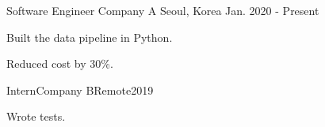 \documentclass[11pt, a4paper]{awesome-cv}
\begin{document}
\makecvheader
{}
\begin{cventries}
  \cventry
    {Software Engineer}
    {Company A}
    {Seoul, Korea}
    {Jan. 2020 - Present}
    {
      \begin{cvitems}
        \item {Built the data pipeline in Python.}
        \item {Reduced cost by 30\%.}
      \end{cvitems}
    }
  \cventry
    {Intern}{Company B}{Remote}{2019}
    {
      \begin{cvitems}
        \item {Wrote tests.}
      \end{cvitems}
    }
\end{cventries}
\begin{cvskills}
\end{cvskills}
\end{document}
